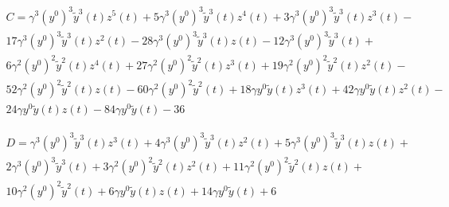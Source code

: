 \documentclass[12pt, letterpaper]{article}
\begin{document}
\begin{equation}
	\begin{aligned}
		C = \gamma^{3} \left(y^{0}\right)^{3} \tilde{y}^{3}{\left(t \right)} z^{5}{\left(t \right)} + 5 \gamma^{3} \left(y^{0}\right)^{3} \tilde{y}^{3}{\left(t \right)} z^{4}{\left(t \right)} + 3 \gamma^{3} \left(y^{0}\right)^{3} \tilde{y}^{3}{\left(t \right)} z^{3}{\left(t \right)} - \\
		17 \gamma^{3} \left(y^{0}\right)^{3} \tilde{y}^{3}{\left(t \right)} z^{2}{\left(t \right)} - 28 \gamma^{3} \left(y^{0}\right)^{3} \tilde{y}^{3}{\left(t \right)} z{\left(t \right)} - 12 \gamma^{3} \left(y^{0}\right)^{3} \tilde{y}^{3}{\left(t \right)} + \\
		6 \gamma^{2} \left(y^{0}\right)^{2} \tilde{y}^{2}{\left(t \right)} z^{4}{\left(t \right)} + 27 \gamma^{2} \left(y^{0}\right)^{2} \tilde{y}^{2}{\left(t \right)} z^{3}{\left(t \right)} + 19 \gamma^{2} \left(y^{0}\right)^{2} \tilde{y}^{2}{\left(t \right)} z^{2}{\left(t \right)} - \\
		52 \gamma^{2} \left(y^{0}\right)^{2} \tilde{y}^{2}{\left(t \right)} z{\left(t \right)} - 60 \gamma^{2} \left(y^{0}\right)^{2} \tilde{y}^{2}{\left(t \right)} + 18 \gamma y^{0} \tilde{y}{\left(t \right)} z^{3}{\left(t \right)} + 42 \gamma y^{0} \tilde{y}{\left(t \right)} z^{2}{\left(t \right)} - \\
		24 \gamma y^{0} \tilde{y}{\left(t \right)} z{\left(t \right)} - 84 \gamma y^{0} \tilde{y}{\left(t \right)} - 36
	\end{aligned}
\end{equation}

\begin{equation}
	\begin{aligned}
		D = \gamma^{3} \left(y^{0}\right)^{3} \tilde{y}^{3}{\left(t \right)} z^{3}{\left(t \right)} + 4 \gamma^{3} \left(y^{0}\right)^{3} \tilde{y}^{3}{\left(t \right)} z^{2}{\left(t \right)} + 5 \gamma^{3} \left(y^{0}\right)^{3} \tilde{y}^{3}{\left(t \right)} z{\left(t \right)} + \\
		2 \gamma^{3} \left(y^{0}\right)^{3} \tilde{y}^{3}{\left(t \right)} + 3 \gamma^{2} \left(y^{0}\right)^{2} \tilde{y}^{2}{\left(t \right)} z^{2}{\left(t \right)} + 11 \gamma^{2} \left(y^{0}\right)^{2} \tilde{y}^{2}{\left(t \right)} z{\left(t \right)} + \\
		10 \gamma^{2} \left(y^{0}\right)^{2} \tilde{y}^{2}{\left(t \right)} + 6 \gamma y^{0} \tilde{y}{\left(t \right)} z{\left(t \right)} + 14 \gamma y^{0} \tilde{y}{\left(t \right)} + 6
	\end{aligned}
\end{equation}
\end{document}
